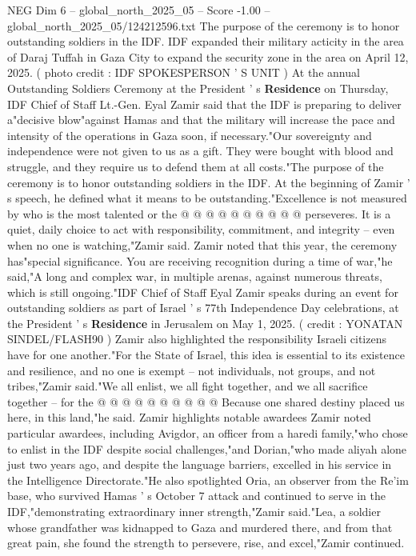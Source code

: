 \begin{textsample}{NEG Dim 6 – global\_north\_2025\_05 – Score -1.00 – global\_north\_2025\_05/124212596.txt}  \label{ex:f6_neg_415}
The purpose of the ceremony is to honor outstanding soldiers in the IDF.
IDF expanded their military acticity in the area of Daraj Tuffah in Gaza City to expand the security zone in the area on April 12, 2025. ( photo credit : IDF SPOKESPERSON ' S UNIT ) At the annual Outstanding Soldiers Ceremony at the President ' s \textbf{Residence} on Thursday, IDF Chief of Staff Lt.-Gen.
Eyal Zamir said that the IDF is preparing to deliver a"decisive blow"against Hamas and that the military will increase the pace and intensity of the operations in Gaza soon, if necessary."Our sovereignty and independence were not given to us as a gift.
They were bought with blood and struggle, and they require us to defend them at all costs."The purpose of the ceremony is to honor outstanding soldiers in the IDF.
At the beginning of Zamir ' s speech, he defined what it means to be outstanding."Excellence is not measured by who is the most talented or the @ @ @ @ @ @ @ @ @ @ perseveres.
It is a quiet, daily choice to act with responsibility, commitment, and integrity -- even when no one is watching,"Zamir said.
Zamir noted that this year, the ceremony has"special significance.
You are receiving recognition during a time of war,"he said,"A long and complex war, in multiple arenas, against numerous threats, which is still ongoing."IDF Chief of Staff Eyal Zamir speaks during an event for outstanding soldiers as part of Israel ' s 77th Independence Day celebrations, at the President ' s \textbf{Residence} in Jerusalem on May 1, 2025. ( credit : YONATAN SINDEL/FLASH90 ) Zamir also highlighted the responsibility Israeli citizens have for one another."For the State of Israel, this idea is essential to its existence and resilience, and no one is exempt -- not individuals, not groups, and not tribes,"Zamir said."We all enlist, we all fight together, and we all sacrifice together -- for the @ @ @ @ @ @ @ @ @ @ Because one shared destiny placed us here, in this land,"he said.
Zamir highlights notable awardees Zamir noted particular awardees, including Avigdor, an officer from a haredi family,"who chose to enlist in the IDF despite social challenges,"and Dorian,"who made aliyah alone just two years ago, and despite the language barriers, excelled in his service in the Intelligence Directorate."He also spotlighted Oria, an observer from the Re'im base, who survived Hamas ' s October 7 attack and continued to serve in the IDF,"demonstrating extraordinary inner strength,"Zamir said."Lea, a soldier whose grandfather was kidnapped to Gaza and murdered there, and from that great pain, she found the strength to persevere, rise, and excel,"Zamir continued.

\end{textsample}
